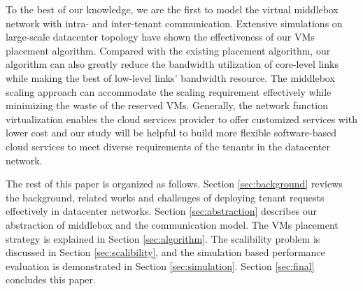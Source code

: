 \documentclass[review]{elsarticle}
\begin{document}
To the best of our knowledge, we are the first to model the virtual middlebox network with intra- and inter-tenant communication.
Extensive simulations on large-scale datacenter topology have shown the effectiveness of our VMs placement
algorithm.
Compared with the existing placement algorithm, our algorithm can also greatly reduce the bandwidth utilization of core-level links while making the best of low-level links' bandwidth resource. The middlebox scaling approach can accommodate the scaling requirement effectively while minimizing the waste of the reserved VMs. %
Generally, the network function virtualization enables the cloud services provider to offer customized services with lower cost and our study will be helpful to build more flexible software-based cloud services to meet diverse requirements of  the tenants in the datacenter network.


The rest of this paper is organized as follows. Section  \ref{sec:background} reviews the background, related works and challenges of deploying tenant requests effectively in datacenter networks.
Section \ref{sec:abstraction} describes our abstraction of middlebox and the communication model. The VMs placement strategy is explained in Section \ref{sec:algorithm}. The scalibility problem is discussed in Section \ref{sec:scalibility}, and the simulation based performance evaluation is demonstrated in Section \ref{sec:simulation}. Section \ref{sec:final} concludes this paper.
\end{document}
